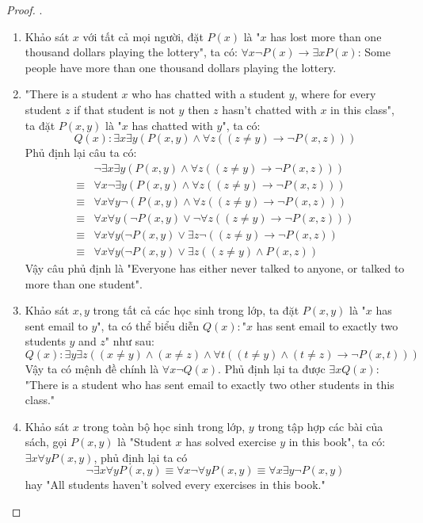 \begin{proof}.
    \begin{enumerate}[label=\alph*)]
        \item Khảo sát $x$ với tất cả mọi người, đặt $P(x)$ là "$x$ has lost more than one thousand dollars playing the lottery", ta có: $\forall x\neg P(x)\rightarrow \exists xP(x)$: Some people have more than one thousand dollars playing the lottery.
        \item "There is a student $x$ who has chatted with a student $y$, where for every student $z$ if that student is not $y$ then $z$ hasn't chatted with $x$ in this class", ta đặt $P(x,y)$ là "$x$ has chatted with $y$", ta có: $$Q(x):\exists x\exists y(P(x,y)\land \forall z((z\neq y)\rightarrow \neg P(x,z)))$$
        Phủ định lại câu ta có: \begin{align*}
            &\neg \exists x\exists y(P(x,y)\land \forall z((z\neq y)\rightarrow \neg P(x,z)))\\
            \equiv&\forall x\neg \exists y(P(x,y)\land \forall z((z\neq y)\rightarrow \neg P(x,z)))\\
            \equiv&\forall x\forall y\neg (P(x,y)\land \forall z((z\neq y)\rightarrow \neg P(x,z)))\\
            \equiv&\forall x\forall y(\neg P(x,y)\lor \neg \forall z((z\neq y)\rightarrow \neg P(x,z)))\\
            \equiv&\forall x\forall y(\neg P(x,y)\lor\exists z\neg((z\neq y)\rightarrow \neg P(x,z))\\
            \equiv&\forall x\forall y(\neg P(x,y)\lor\exists z((z\neq y)\land P(x,z))
        \end{align*}
        Vậy câu phủ định là "Everyone has either never talked to anyone, or talked to more than one student".
        \item Khảo sát $x,y$ trong tất cả các học sinh trong lớp, ta đặt $P(x,y)$ là "$x$ has sent email to $y$", ta có thể biểu diễn $Q(x): $"$x$ has sent email to exactly two students $y$ and $z$" như sau: $$Q(x):\exists y\exists z((x\neq y)\land (x\neq z)\land \forall t((t\neq y)\land (t\neq z)\rightarrow \neg P(x,t)))$$
        Vậy ta có mệnh đề chính là $\forall x\neg Q(x)$. Phủ định lại ta được $\exists x Q(x)$: "There is a student who has sent email to exactly two other students in this class."
        \item Khảo sát $x$ trong toàn bộ học sinh trong lớp, $y$ trong tập hợp các bài của sách, gọi $P(x,y)$ là "Student $x$ has solved exercise $y$ in this book", ta có: $\exists x\forall yP(x,y)$, phủ định lại ta có $$\neg\exists x\forall yP(x,y)\equiv \forall x\neg\forall yP(x,y)\equiv \forall x\exists y\neg P(x,y)$$hay "All students haven't solved every exercises in this book."

\end{enumerate}
\end{proof}
